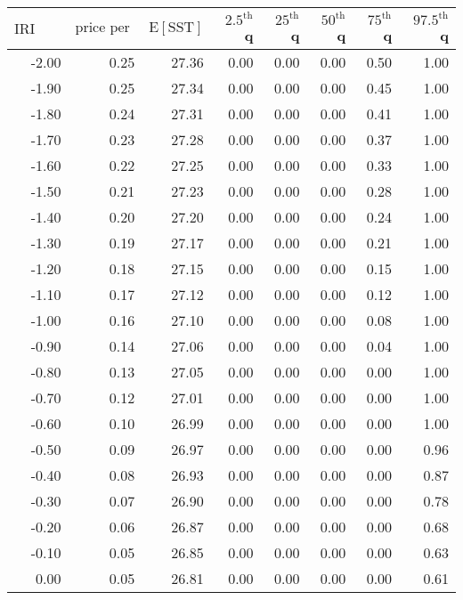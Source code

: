 \begin{table*}[ht]
\centering \footnotesize
\begin{tabular}{rrrrrrrr}
  \hline
$\mbox{IRI anom}$ & $\mbox{price per USD}$ & $\mbox{E}[\mbox{SST}]$ & $2.5^{\mbox{th}}$ q & $25^{\mbox{th}}$ q & $50^{\mbox{th}}$ q & $75^{\mbox{th}}$ q & $97.5^{\mbox{th}}$ q \\ 
  \hline
-2.00 & 0.25 & 27.36 & 0.00 & 0.00 & 0.00 & 0.50 & 1.00 \\ 
  -1.90 & 0.25 & 27.34 & 0.00 & 0.00 & 0.00 & 0.45 & 1.00 \\ 
  -1.80 & 0.24 & 27.31 & 0.00 & 0.00 & 0.00 & 0.41 & 1.00 \\ 
  -1.70 & 0.23 & 27.28 & 0.00 & 0.00 & 0.00 & 0.37 & 1.00 \\ 
  -1.60 & 0.22 & 27.25 & 0.00 & 0.00 & 0.00 & 0.33 & 1.00 \\ 
  -1.50 & 0.21 & 27.23 & 0.00 & 0.00 & 0.00 & 0.28 & 1.00 \\ 
  -1.40 & 0.20 & 27.20 & 0.00 & 0.00 & 0.00 & 0.24 & 1.00 \\ 
  -1.30 & 0.19 & 27.17 & 0.00 & 0.00 & 0.00 & 0.21 & 1.00 \\ 
  -1.20 & 0.18 & 27.15 & 0.00 & 0.00 & 0.00 & 0.15 & 1.00 \\ 
  -1.10 & 0.17 & 27.12 & 0.00 & 0.00 & 0.00 & 0.12 & 1.00 \\ 
  -1.00 & 0.16 & 27.10 & 0.00 & 0.00 & 0.00 & 0.08 & 1.00 \\ 
  -0.90 & 0.14 & 27.06 & 0.00 & 0.00 & 0.00 & 0.04 & 1.00 \\ 
  -0.80 & 0.13 & 27.05 & 0.00 & 0.00 & 0.00 & 0.00 & 1.00 \\ 
  -0.70 & 0.12 & 27.01 & 0.00 & 0.00 & 0.00 & 0.00 & 1.00 \\ 
  -0.60 & 0.10 & 26.99 & 0.00 & 0.00 & 0.00 & 0.00 & 1.00 \\ 
  -0.50 & 0.09 & 26.97 & 0.00 & 0.00 & 0.00 & 0.00 & 0.96 \\ 
  -0.40 & 0.08 & 26.93 & 0.00 & 0.00 & 0.00 & 0.00 & 0.87 \\ 
  -0.30 & 0.07 & 26.90 & 0.00 & 0.00 & 0.00 & 0.00 & 0.78 \\ 
  -0.20 & 0.06 & 26.87 & 0.00 & 0.00 & 0.00 & 0.00 & 0.68 \\ 
  -0.10 & 0.05 & 26.85 & 0.00 & 0.00 & 0.00 & 0.00 & 0.63 \\ 
  0.00 & 0.05 & 26.81 & 0.00 & 0.00 & 0.00 & 0.00 & 0.61 \\ 

\end{tabular}
\end{table*}
